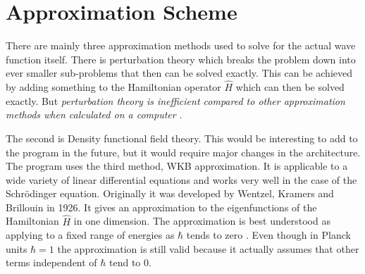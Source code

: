\documentclass[11pt,DIV=10,final]{scrreprt} %
\begin{document}
\section{Approximation Scheme}\label{meth:wkb:approximation-scheme}
There are mainly three approximation methods used to solve for the actual wave function itself. There is perturbation theory which breaks the problem down into ever smaller sub-problems that then can be
solved exactly. This can be achieved by adding something to the Hamiltonian operator $\hat{H}$ which can then be solved exactly. But \textit{perturbation theory is inefficient compared to other approximation
methods when calculated on a computer} \citep[Introduction]{van2014density}.

The second is Density functional field theory. This would be interesting to add to the program in the future, but it would require major changes in the architecture.
\\

The program uses the third method, WKB approximation. It is applicable to a wide variety of linear differential equations and works very well in the case of the Schrödinger equation.
Originally it was developed by Wentzel, Kramers and Brillouin in 1926. It gives an approximation to the eigenfunctions of the Hamiltonian $\hat{H}$ in one dimension. The approximation is best
understood as applying to a fixed range of energies as $\hbar$ tends to zero \citep[p.~305]{hall2013quantum}. Even though in Planck units $\hbar = 1$ the approximation is still valid because it
actually assumes that other terms independent of $\hbar$ tend to 0.
\\
\end{document}
